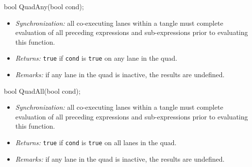 \begin{HLSL}
bool QuadAny(bool cond);
\end{HLSL}

\begin{itemize}
  \item \textit{Synchronization:} all co-executing \gls{lane}s within a \gls{tangle}
  must complete evaluation of all preceding expressions and sub-expressions
  prior to evaluating this function.
  \item \textit{Returns:} \texttt{true} if \texttt{cond} is \texttt{true} on any
  \gls{lane} in the \gls{quad}.
  \item \textit{Remarks:} if any \gls{lane} in the \gls{quad} is inactive, the
  results are undefined.
\end{itemize}

\begin{HLSL}
bool QuadAll(bool cond);
\end{HLSL}

\begin{itemize}
  \item \textit{Synchronization:} all co-executing \gls{lane}s within a \gls{tangle}
  must complete evaluation of all preceding expressions and sub-expressions
  prior to evaluating this function.
  \item \textit{Returns:} \texttt{true} if \texttt{cond} is \texttt{true} on all
  \gls{lane}s in the \gls{quad}.
  \item \textit{Remarks:} if any \gls{lane} in the \gls{quad} is inactive, the
  results are undefined.
\end{itemize}

